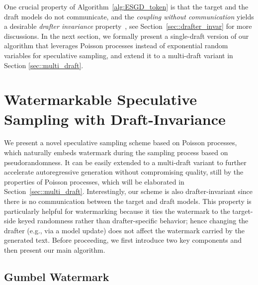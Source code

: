 \documentclass{article}
\theoremstyle{plain}
\theoremstyle{definition}
\begin{document}
One crucial property of Algorithm~\ref{alg:ESGD_token} is that the target and the draft models do not communicate, and the \emph{coupling without communication} yields a desirable \emph{drafter invariance} property~\citep{daliri2025coupling, rowan2025list}, see Section~\ref{sec::drafter_invar} for more discussions. 
In the next section, 
we formally present a single-draft version of our algorithm that %
leverages Poisson processes instead of exponential random variables for speculative sampling, and extend it to a multi-draft variant in Section \ref{sec::multi_draft}. 



\section{Watermarkable Speculative Sampling with Draft-Invariance}\label{sec:SingleVersion}


We present a novel speculative sampling scheme based on Poisson processes, which naturally embeds watermark during the sampling process based on pseudorandomness. 
It can be easily extended to a multi-draft variant %
to further accelerate autoregressive generation without compromising quality, still by the properties of Poisson processes, which %
will be elaborated in Section~\ref{sec::multi_draft}. 
Interestingly, our scheme is also drafter-invariant since there is no communication between the target and draft models. This property is particularly helpful for watermarking because it ties the watermark to the target-side keyed randomness rather than drafter-specific behavior; hence changing the drafter (e.g., via a model update) does not affect the watermark carried by the generated text. 
Before proceeding, %
we first introduce two key components and then present our main algorithm. %

\subsection{Gumbel Watermark}
\label{subsec::gumbel_water}
\end{document}
